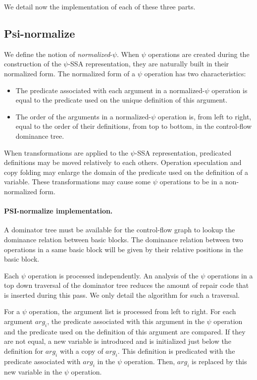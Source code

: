 We detail now the implementation of each of these three parts.

\subsection{Psi-normalize}

We define the notion of {\em normalized}-$\psi$. When $\psi$
operations are created during the construction of the $\psi$-SSA
representation, they are naturally built in their normalized form. The
normalized form of a $\psi$ operation has two characteristics:

\begin{itemize}
\item The predicate associated with each argument in a
normalized-$\psi$ operation is equal to the predicate used on the
unique definition of this argument.
\item The order of the arguments in a normalized-$\psi$ operation is,
from left to right, equal to the order of their definitions, from top
to bottom, in the control-flow dominance tree.
\end{itemize}

When transformations are applied to the $\psi$-SSA representation,
predicated definitions may be moved relatively to each others.
Operation speculation and copy folding may enlarge the domain of the
predicate used on the definition of a variable. These transformations
may cause some $\psi$ operations to be in a non-normalized form.

\paragraph{PSI-normalize implementation.}
A dominator tree must be available for the control-flow graph to
lookup the dominance relation between basic blocks. The dominance
relation between two operations in a same basic block will be given by
their relative positions in the basic block.

Each $\psi$ operation is processed independently. An analysis of the
$\psi$ operations in a top down traversal of the dominator tree
reduces the amount of repair code that is inserted during this pass. We
only detail the algorithm for such a traversal.

For a $\psi$ operation, the argument list is processed from left to
right. For each argument $arg_i$, the predicate associated with this
argument in the $\psi$ operation and the predicate used on the
definition of this argument are compared. If they are not equal, a new
variable is introduced and is initialized just below the definition
for $arg_i$ with a copy of $arg_i$. This definition is predicated with
the predicate associated with $arg_i$ in the $\psi$ operation. Then,
$arg_i$ is replaced by this new variable in the $\psi$
operation.


